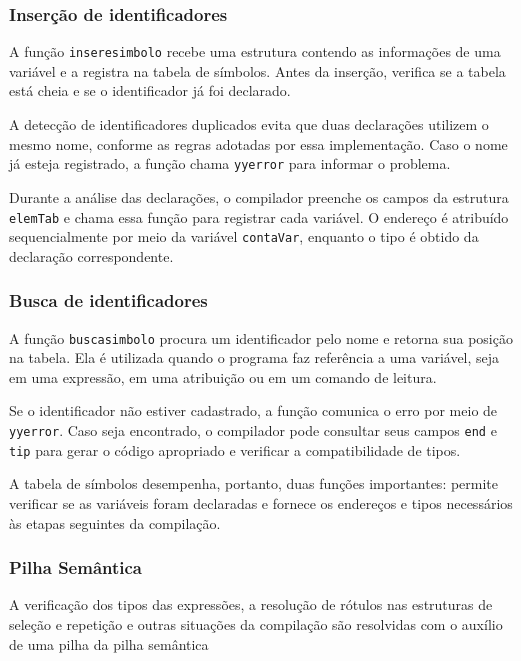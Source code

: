 \documentclass[
  brazilian,
  letterpaper,
]{book}
\theoremstyle{plain}
\theoremstyle{definition}
\theoremstyle{remark}
\begin{document}
\subsubsection{Inserção de
identificadores}\label{inseruxe7uxe3o-de-identificadores}

A função \texttt{inseresimbolo} recebe uma estrutura contendo as
informações de uma variável e a registra na tabela de símbolos. Antes da
inserção, verifica se a tabela está cheia e se o identificador já foi
declarado.

A detecção de identificadores duplicados evita que duas declarações
utilizem o mesmo nome, conforme as regras adotadas por essa
implementação. Caso o nome já esteja registrado, a função chama
\texttt{yyerror} para informar o problema.

Durante a análise das declarações, o compilador preenche os campos da
estrutura \texttt{elemTab} e chama essa função para registrar cada
variável. O endereço é atribuído sequencialmente por meio da variável
\texttt{contaVar}, enquanto o tipo é obtido da declaração
correspondente.

\subsubsection{Busca de identificadores}\label{busca-de-identificadores}

A função \texttt{buscasimbolo} procura um identificador pelo nome e
retorna sua posição na tabela. Ela é utilizada quando o programa faz
referência a uma variável, seja em uma expressão, em uma atribuição ou
em um comando de leitura.

Se o identificador não estiver cadastrado, a função comunica o erro por
meio de \texttt{yyerror}. Caso seja encontrado, o compilador pode
consultar seus campos \texttt{end} e \texttt{tip} para gerar o código
apropriado e verificar a compatibilidade de tipos.

A tabela de símbolos desempenha, portanto, duas funções importantes:
permite verificar se as variáveis foram declaradas e fornece os
endereços e tipos necessários às etapas seguintes da compilação.

\subsubsection{Pilha Semântica}\label{pilha-semuxe2ntica}

A verificação dos tipos das expressões, a resolução de rótulos nas
estruturas de seleção e repetição e outras situações da compilação são
resolvidas com o auxílio de uma pilha da pilha semântica
\end{document}
